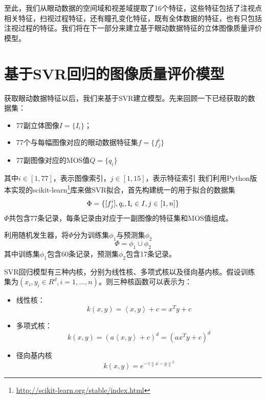 至此，我们从眼动数据的空间域和视差域提取了16个特征，这些特征包括了注视点相关特征，扫视过程特征，还有瞳孔变化特征，既有全体数据的特征，也有只包括注视过程的特征。我们将在下一部分来建立基于眼动数据特征的立体图像质量评价模型。
\section{基于SVR回归的图像质量评价模型}
\label{sec:modelconstruction}
获取眼动数据特征以后，我们来基于SVR建立模型。先来回顾一下已经获取的数据集：
\begin{itemize}[noitemsep,topsep=0pt,parsep=0pt,partopsep=0pt]
\item 77副立体图像$I=\{I_i\}$；
\item 77个与每幅图像对应的眼动数据特征集$f=\{f_j^i\}$
\item 77副图像对应的MOS值$Q =\{q_i\}$
\end{itemize}
其中$i \in [1,77]$，表示图像索引，$j \in [1,15]$，表示特征索引
我们利用Python版本实现的scikit-learn\footnote{\url{http://scikit-learn.org/stable/index.html}}库来做SVR拟合，首先构建统一的用于拟合的数据集
\begin{equation}
\Phi  = \{ [{f_j^i}],{q_i},{{\rm{I}}_i} \in I,j \in [1,n]\} {\rm{  }}
\end{equation}
$\Phi $共包含77条记录，每条记录由对应于一副图像的特征集和MOS值组成。

利用随机发生器，将$\Phi $分为训练集$\phi _1$与预测集$\phi _2$
\begin{equation}
\Phi  = {\phi _1} \cup {\phi _2}
\end{equation}
其中训练集$\phi _1$包含60条记录，预测集$\phi _2$包含17条记录。

SVR回归模型有三种内核，分别为线性核、多项式核以及径向基内核。假设训练集为${({x_i},{y_i} \in {R^d},i = 1, \ldots ,n)}$。则三种核函数可以表示为：
\begin{itemize}[noitemsep,topsep=0pt,parsep=0pt,partopsep=0pt]
\item 线性核：
\begin{equation}
{k(x,y) = \left\langle {x,y} \right\rangle  + c = {x^T}y + c }
\end{equation}
\item 多项式核：
\begin{equation}
{k(x,y) = {(a\left\langle {x,y} \right\rangle  + c)^d} = {(a{x^T}y + c)^d}}
\end{equation}
\item 径向基内核
\begin{equation}
{k(x,y) = {e^{ - \gamma {{\left\| {x - y} \right\|}^2}}}}
\end{equation}
\end{itemize}

